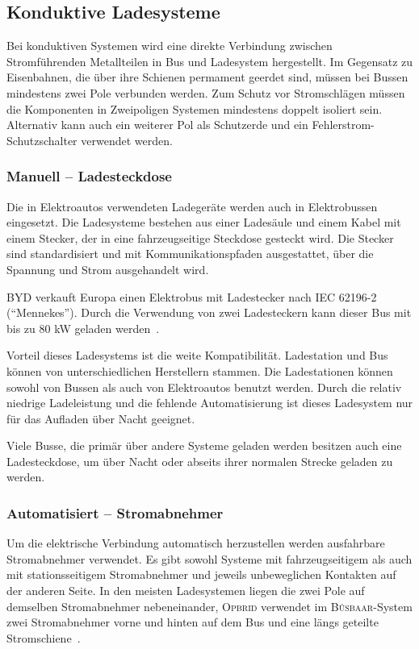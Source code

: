 \subsection{Konduktive Ladesysteme} 
Bei konduktiven Systemen wird eine direkte Verbindung zwischen Stromführenden Metallteilen in Bus und Ladesystem hergestellt. Im Gegensatz zu Eisenbahnen, die über ihre Schienen permament geerdet sind, müssen bei Bussen mindestens zwei Pole verbunden werden. Zum Schutz vor Stromschlägen müssen die Komponenten in Zweipoligen Systemen mindestens doppelt isoliert sein. Alternativ kann auch ein weiterer Pol als Schutzerde und ein Fehlerstrom-Schutzschalter verwendet werden.

\subsubsection{Manuell – Ladesteckdose}
Die in Elektroautos verwendeten Ladegeräte werden auch in Elektrobussen eingesetzt. Die Ladesysteme bestehen aus einer Ladesäule und einem Kabel mit einem Stecker, der in eine fahrzeugseitige Steckdose gesteckt wird. Die Stecker sind standardisiert und mit Kommunikationspfaden ausgestattet, über die Spannung und Strom ausgehandelt wird.

\textsc{BYD} verkauft Europa einen Elektrobus mit Ladestecker nach IEC 62196-2 ("`Mennekes"'). Durch die Verwendung von zwei Ladesteckern kann dieser Bus mit bis zu 80 kW geladen werden~\cite{bydSpecs4}.

Vorteil dieses Ladesystems ist die weite Kompatibilität. Ladestation und Bus können von unterschiedlichen Herstellern stammen. Die Ladestationen können sowohl von Bussen als auch von Elektroautos benutzt werden. Durch die relativ niedrige Ladeleistung und die fehlende Automatisierung ist dieses Ladesystem nur für das Aufladen über Nacht geeignet.

Viele Busse, die primär über andere Systeme geladen werden besitzen auch eine Ladesteckdose, um über Nacht oder abseits ihrer normalen Strecke geladen zu werden.

\subsubsection{Automatisiert – Stromabnehmer}
Um die elektrische Verbindung automatisch herzustellen werden ausfahrbare Stromabnehmer verwendet. Es gibt sowohl Systeme mit fahrzeugseitigem als auch mit stationsseitigem Stromabnehmer und jeweils unbeweglichen Kontakten auf der anderen Seite. In den meisten Ladesystemen liegen die zwei Pole auf demselben Stromabnehmer nebeneinander, \textsc{Opbrid} verwendet im \textsc{Bůsbaar}-System zwei Stromabnehmer vorne und hinten auf dem Bus und eine längs geteilte Stromschiene~\cite{SchKonLade}.

